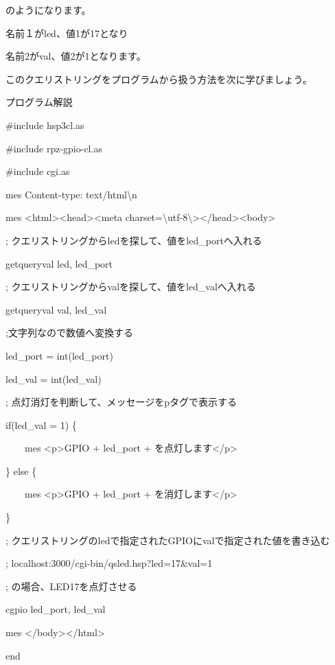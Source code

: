 \documentclass[a4paper,12pt,dvipdfmx]{jarticle}
\begin{document}
のようになります。

名前１がled、値1が17となり

名前2がval、値2が1となります。

このクエリストリングをプログラムから扱う方法を次に学びましょう。

\clearpage
プログラム解説



\centering
\begin{boxedminipage}{16.538cm}
	\#include {\textquotedbl}hsp3cl.as{\textquotedbl}

	\#include {\textquotedbl}rpz-gpio-cl.as{\textquotedbl}

	\#include {\textquotedbl}cgi.as{\textquotedbl}

	mes {\textquotedbl}Content-type: text/html{\textbackslash}n{\textquotedbl}

	mes {\textquotedbl}{\textless}html{\textgreater}{\textless}head{\textgreater}{\textless}meta
	charset={\textbackslash}{\textquotedbl}utf-8{\textbackslash}{\textquotedbl}{\textgreater}{\textless}/head{\textgreater}{\textless}body{\textgreater}{\textquotedbl}


	\bigskip

	;
	クエリストリングからledを探して、値をled\_portへ入れる

	getqueryval {\textquotedbl}led{\textquotedbl}, led\_port

	;
	クエリストリングからvalを探して、値をled\_valへ入れる

	getqueryval {\textquotedbl}val{\textquotedbl}, led\_val

	;文字列なので数値へ変換する

	led\_port = int(led\_port)

	led\_val = int(led\_val)


	\bigskip

	;
	点灯消灯を判断して、メッセージをpタグで表示する

	if(led\_val = 1) \{

	\ \ \ \ mes {\textquotedbl}{\textless}p{\textgreater}GPIO{\textquotedbl} + led\_port +
	{\textquotedbl}を点灯します{\textless}/p{\textgreater}{\textquotedbl}

	\} else \{

	\ \ \ \ mes {\textquotedbl}{\textless}p{\textgreater}GPIO{\textquotedbl} + led\_port +
	{\textquotedbl}を消灯します{\textless}/p{\textgreater}{\textquotedbl}

	\}


	\bigskip

	;
	クエリストリングのledで指定されたGPIOにvalで指定された値を書き込む

	; localhost:3000/cgi-bin/qsled.hsp?led=17\&val=1

	; の場合、LED17を点灯させる

	cgpio led\_port, led\_val

	mes {\textquotedbl}{\textless}/body{\textgreater}{\textless}/html{\textgreater}{\textquotedbl}

	end
\end{boxedminipage}
\flushleft
\end{document}
